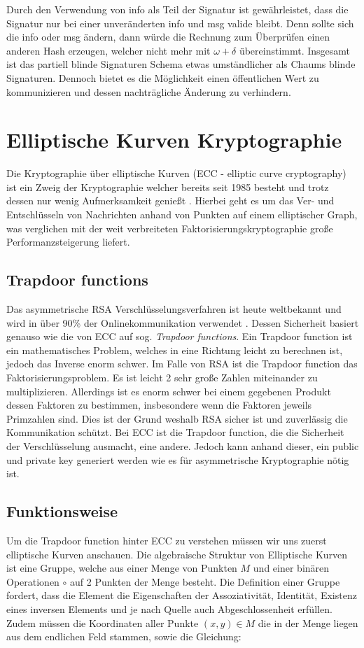 \documentclass[11pt,a4paper]{scrreprt}
\begin{document}
Durch den Verwendung von info als Teil der Signatur ist gewährleistet, dass die Signatur nur bei einer unveränderten info und msg valide bleibt. Denn sollte sich die info oder msg ändern, dann würde die Rechnung zum Überprüfen einen anderen Hash erzeugen, welcher nicht mehr mit $\omega+\delta$ übereinstimmt. Insgesamt ist das partiell blinde Signaturen Schema etwas umständlicher als Chaums blinde Signaturen. Dennoch bietet es die Möglichkeit einen öffentlichen Wert zu kommunizieren und dessen nachträgliche Änderung zu verhindern.


\section{Elliptische Kurven Kryptographie}
Die Kryptographie über elliptische Kurven (ECC - elliptic curve cryptography) ist ein Zweig der Kryptographie welcher bereits seit 1985 besteht \cite{ecc-miller1985use} und trotz dessen nur wenig Aufmerksamkeit genießt . Hierbei geht es um das Ver- und Entschlüsseln von Nachrichten anhand von Punkten auf einem elliptischer Graph, was verglichen mit der weit verbreiteten Faktorisierungskryptographie große Performanzsteigerung liefert.

\subsection{Trapdoor functions}
Das asymmetrische RSA Verschlüsselungsverfahren ist heute weltbekannt und wird in über 90\% der Onlinekommunikation verwendet \cite{ecc-rsa_amount}. Dessen Sicherheit basiert genauso wie die von ECC auf sog.  \textit{Trapdoor functions}. Ein Trapdoor function ist ein mathematisches Problem, welches in eine Richtung leicht zu berechnen ist, jedoch das Inverse enorm schwer. Im Falle von RSA ist die Trapdoor function das Faktorisierungsproblem. Es ist leicht 2 sehr große Zahlen miteinander zu multiplizieren. Allerdings ist es enorm schwer bei einem gegebenen Produkt dessen Faktoren zu bestimmen, insbesondere wenn die Faktoren jeweils Primzahlen sind. Dies ist der Grund weshalb RSA sicher ist und zuverlässig die Kommunikation schützt. Bei ECC ist die Trapdoor function, die die Sicherheit der Verschlüsselung ausmacht, eine andere. Jedoch kann anhand dieser, ein public und private key generiert werden wie es für asymmetrische Kryptographie nötig ist.
\subsection{Funktionsweise}
Um die Trapdoor function hinter ECC zu verstehen müssen wir uns zuerst elliptische Kurven anschauen. Die algebraische Struktur von Elliptische Kurven ist eine Gruppe, welche aus einer Menge von Punkten $M$ und einer binären Operationen $\circ$ auf 2 Punkten der Menge besteht. Die Definition einer Gruppe fordert, dass die Element die Eigenschaften der Assoziativität, Identität, Existenz eines inversen Elements und je nach Quelle auch Abgeschlossenheit erfüllen. \cite{ecc-aradi2016einfuhrung}\cite{ecc-bogopolskij2008introduction} Zudem müssen die Koordinaten aller Punkte $(x,y) \in M$ die in der Menge liegen aus dem endlichen Feld stammen, sowie die Gleichung:
\end{document}
